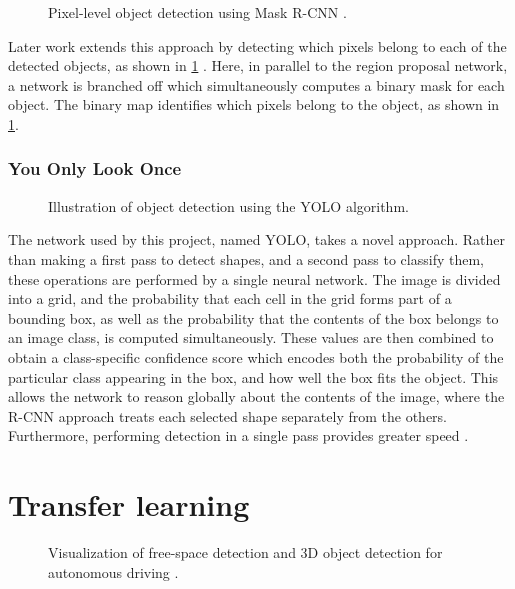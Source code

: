 \documentclass[\rootfolder/main.tex]{subfiles}
\begin{document}
\begin{figure}[H]
    \caption{Pixel-level object detection using Mask R-CNN \cite{He2017}.\label{fig:mask-rcnn}}
\end{figure}

Later work extends this approach by detecting which pixels belong to each of the detected objects, as shown in \cref{fig:mask-rcnn} \cite{He2017}.
Here, in parallel to the region proposal network, a network is branched off which simultaneously computes a binary mask for each object.
The binary map identifies which pixels belong to the object, as shown in \cref{fig:mask-rcnn}.

\subsubsection{You Only Look Once}

\begin{figure}[H]
    \caption{Illustration of object detection using the YOLO algorithm\cite{JosephRedmon}.\label{fig:yolo}}
\end{figure}

The network used by this project, named YOLO, takes a novel approach.
Rather than making a first pass to detect shapes, and a second pass to classify them, these operations are performed by a single neural network.
The image is divided into a grid, and the probability that each cell in the grid forms part of a bounding box, as well as the probability that the contents of the box belongs to an image class, is computed simultaneously.
These values are then combined to obtain a class-specific confidence score which encodes both the probability of the particular class appearing in the box, and how well the box fits the object.
This allows the network to reason globally about the contents of the image, where the R-CNN approach treats each selected shape separately from the others.
Furthermore, performing detection in a single pass provides greater speed \cite{Redmon2015}.

\section{Transfer learning}

\begin{figure}
    \caption{Visualization of free-space detection and 3D object detection for autonomous driving \cite{NVIDIA}.\label{fig:nvidia-cnn}}
\end{figure}
\end{document}
